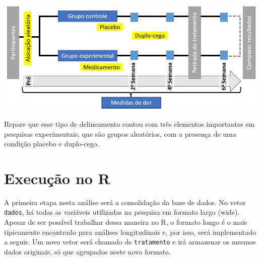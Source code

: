 \documentclass[
]{book}
\begin{document}
\includegraphics{./img/delineamento_experimental.png}

Repare que esse tipo de delineamento contou com três elementos importantes em pesquisas experimentais, que são grupos aleatórios, com a presença de uma condição placebo e duplo-cego.

\hypertarget{execuuxe7uxe3o-no-r-10}{%
\section{Execução no R}\label{execuuxe7uxe3o-no-r-10}}

A primeira etapa nesta análise será a consolidação da base de dados. No vetor \texttt{dados}, há todas as variáveis utilizadas na pesquisa em formato largo (wide). Apesar de ser possível trabalhar dessa maneira no R, o formato longo é o mais tipicamente encontrado para análises longitudinais e, por isso, será implementado a seguir. Um novo vetor será chamado de \texttt{tratamento} e irá armazenar os mesmos dados originais, só que agrupados neste novo formato.
\end{document}
